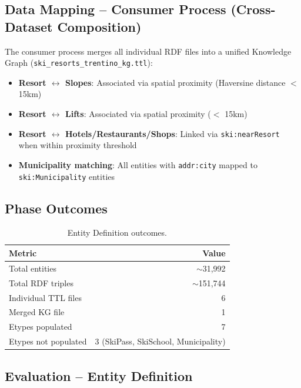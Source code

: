 \subsection{Data Mapping -- Consumer Process (Cross-Dataset Composition)}

The consumer process merges all individual RDF files into a unified Knowledge Graph (\texttt{ski\_resorts\_trentino\_kg.ttl}):
\begin{itemize}
    \item \textbf{Resort $\leftrightarrow$ Slopes}: Associated via spatial proximity (Haversine distance $<$ 15km)
    \item \textbf{Resort $\leftrightarrow$ Lifts}: Associated via spatial proximity ($<$ 15km)
    \item \textbf{Resort $\leftrightarrow$ Hotels/Restaurants/Shops}: Linked via \texttt{ski:nearResort} when within proximity threshold
    \item \textbf{Municipality matching}: All entities with \texttt{addr:city} mapped to \texttt{ski:Municipality} entities
\end{itemize}

\subsection{Phase Outcomes}

\begin{table}[h!]
\centering
\begin{tabular}{|l|r|}
\hline
\textbf{Metric} & \textbf{Value} \\
\hline
Total entities & $\sim$31,992 \\
Total RDF triples & $\sim$151,744 \\
Individual TTL files & 6 \\
Merged KG file & 1 \\
Etypes populated & 7 \\
Etypes not populated & 3 (SkiPass, SkiSchool, Municipality) \\
\hline
\end{tabular}
\caption{Entity Definition outcomes.}
\end{table}

\subsection{Evaluation -- Entity Definition}

